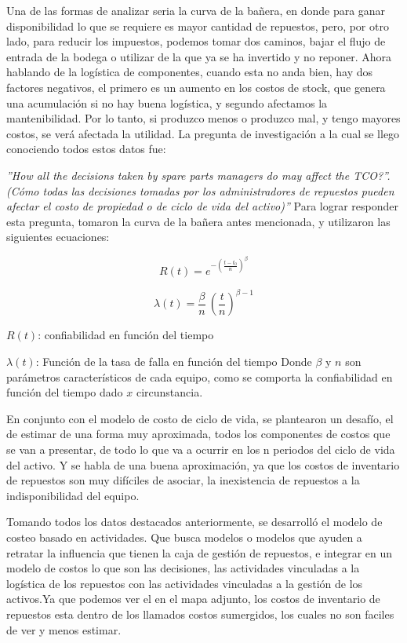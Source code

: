 \documentclass[]{article}
\begin{document}
Una de las formas de analizar seria la curva de la bañera, en donde para ganar disponibilidad lo que se requiere es mayor cantidad de repuestos, pero, por otro lado, para reducir los impuestos, podemos tomar dos caminos, bajar el flujo de entrada de la bodega o utilizar de la que ya se ha invertido y no reponer. 
Ahora hablando de la logística de componentes, cuando esta no anda bien, hay dos factores negativos, el primero es un aumento en los costos de stock, que genera una acumulación si no hay buena logística, y segundo afectamos la mantenibilidad. Por lo tanto, si produzco menos o produzco mal, y tengo mayores costos, se verá afectada la utilidad.
La pregunta de investigación a la cual se llego conociendo todos estos datos fue: 

\textsl{''How all the decisions taken by spare parts managers do may affect the TCO?”. (Cómo todas las decisiones tomadas por los administradores de repuestos pueden afectar el costo de propiedad o de ciclo de vida del activo)''}
Para lograr responder esta pregunta, tomaron la curva de la bañera antes mencionada, y utilizaron las siguientes ecuaciones:

\begin{equation}
    R(t) = e^{{-(\frac{t-t_0}{n})}^{\beta}}
\end{equation}

\begin{equation}
    \lambda(t) = \frac{\beta}{n} \ \! (\frac{t}{n})^{\beta - 1} 
\end{equation}

$R(t)$: confiabilidad en función del tiempo

$\lambda(t)$: Función de la tasa de falla en función del tiempo
Donde $\beta$ y $n$ son parámetros característicos de cada equipo, como se comporta la confiabilidad en función del tiempo dado $x$ circunstancia.

En conjunto con el modelo de costo de ciclo de vida, se plantearon un desafío, el de estimar de una forma muy aproximada, todos los componentes de costos que se van a presentar, de todo lo que va a ocurrir en los n periodos del ciclo de vida del activo. Y se habla de una buena aproximación, ya que los costos de inventario de repuestos son muy difíciles de asociar, la inexistencia de repuestos a la indisponibilidad del equipo. 

Tomando todos los datos destacados anteriormente, se desarrolló el modelo de costeo basado en actividades. Que busca modelos o modelos que ayuden a retratar la influencia que tienen la caja de gestión de repuestos, e integrar en un modelo de costos lo que son las decisiones, las actividades vinculadas a la logística de los repuestos con las actividades vinculadas a la gestión de los activos.Ya que podemos ver el en el mapa adjunto, los costos de inventario de repuestos esta dentro de los llamados costos sumergidos, los cuales no son faciles de ver y menos estimar.  
\end{document}
